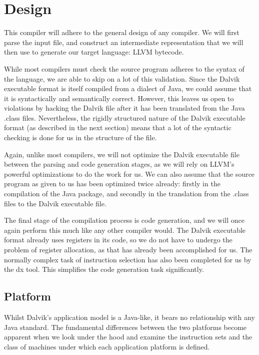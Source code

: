 \chapter{Design}

This compiler will adhere to the general design of any compiler. We will first parse the input file, and construct an intermediate representation that we will then use to generate our target language: LLVM bytecode.

While most compilers must check the source program adheres to the syntax of the language, we are able to skip on a lot of this validation. Since the Dalvik executable format is itself compiled from a dialect of Java, we could assume that it is syntactically and semantically correct. However, this leaves us open to violations by hacking the Dalvik file after it has been translated from the Java .class files. Nevertheless, the rigidly structured nature of the Dalvik executable format (as described in the next section) means that a lot of the syntactic checking is done for us in the structure of the file.

Again, unlike most compilers, we will not optimize the Dalvik executable file between the parsing and code generation stages, as we will rely on LLVM's powerful optimizations to do the work for us. We can also assume that the source program as given to us has been optimized twice already: firstly in the compilation of the Java package, and secondly in the translation from the .class files to the Dalvik executable file.
 
The final stage of the compilation process is code generation, and we will once again perform this much like any other compiler would. The Dalvik executable format already uses registers in its code, so we do not have to undergo the problem of register allocation, as that has already been accomplished for us. The normally complex task of instruction selection has also been completed for us by the dx tool. This simplifies the code generation task significantly.
 
\section{Platform}

Whilst Dalvik's application model is a Java-like, it bears no relationship with any Java standard. The fundamental differences between the two platforms become apparent when we look under the hood and examine the instruction sets and the class of machines under which each application platform is defined.

